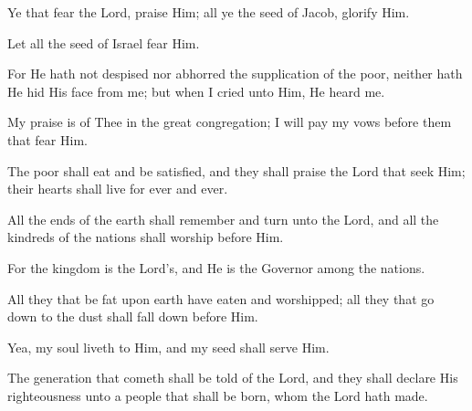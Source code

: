 Ye that fear the Lord, praise Him; all ye the seed of Jacob, glorify Him.

Let all the seed of Israel fear Him.

For He hath not despised nor abhorred the supplication of the poor, neither hath He hid His face from me; but when I cried unto Him, He heard me.

My praise is of Thee in the great congregation; I will pay my vows before them that fear Him.

The poor shall eat and be satisfied, and they shall praise the Lord that seek Him; their hearts shall live for ever and ever.

All the ends of the earth shall remember and turn unto the Lord, and all the kindreds of the nations shall worship before Him.

For the kingdom is the Lord's, and He is the Governor among the nations.

All they that be fat upon earth have eaten and worshipped; all they that go down to the dust shall fall down before Him.

Yea, my soul liveth to Him, and my seed shall serve Him.

The generation that cometh shall be told of the Lord, and they shall declare His righteousness unto a people that shall be born, whom the Lord hath made.
